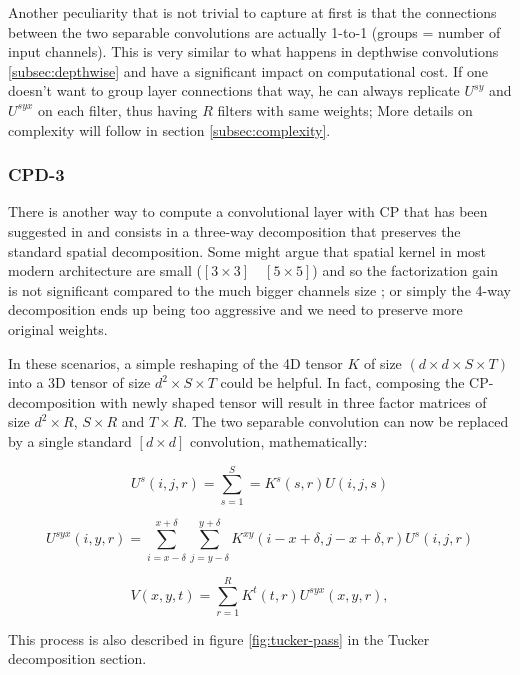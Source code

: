 Another peculiarity that is not trivial to capture at first is that the connections between the two separable convolutions are actually 1-to-1 (groups = number of input channels). This is very similar to what happens in depthwise convolutions \ref{subsec:depthwise} and have a significant impact on computational cost. If one doesn't want to group layer connections that way, he can always replicate $U^{sy}$ and $U^{syx}$ on each filter, thus having $R$ filters with same weights; More details on complexity will follow in section \ref{subsec:complexity}.


\subsubsection{CPD-3}
There is another way to compute a convolutional layer with CP that has been suggested in\parencite{astrid2017} and consists in a three-way decomposition that preserves the standard spatial decomposition. Some might argue that spatial kernel in most modern architecture are small ($[3 \times 3] \quad [5 \times 5]$) and so the factorization gain is not significant compared to the much bigger channels size \parencite{Tucker-mobile}; or simply the 4-way decomposition ends up being too aggressive and we need to preserve more original weights.

In these scenarios, a simple reshaping of the 4D tensor $K$ of size $(d \times d \times S \times T)$ into a 3D tensor of size $d^2 \times S \times T$ could be helpful. In fact, composing the CP-decomposition with newly shaped tensor will result in three factor matrices of size $d^2 \times R$, $S \times R$ and $T \times R$. The two separable convolution can now be replaced by a single standard $[d \times d]$ convolution, mathematically: 

\begin{equation}
    U^s(i,j,r) =\sum^{S}_{s=1}=K^s(s,r)U(i,j,s)    
\end{equation}

\begin{equation}
    U^{syx}(i,y,r) = \sum_{i=x-\delta}^{x + \delta} \sum_{j=y-\delta}^{y+\delta} K^{xy} (i-x+\delta, j-x + \delta,r)U^{s}(i,j,r)
\end{equation}

\begin{equation}
    V(x,y,t) = \sum_{r=1}^R K^t (t,r) U^{syx}(x,y,r),
\end{equation}

This process is also described in figure \ref{fig:tucker-pass} in the Tucker decomposition section. 

